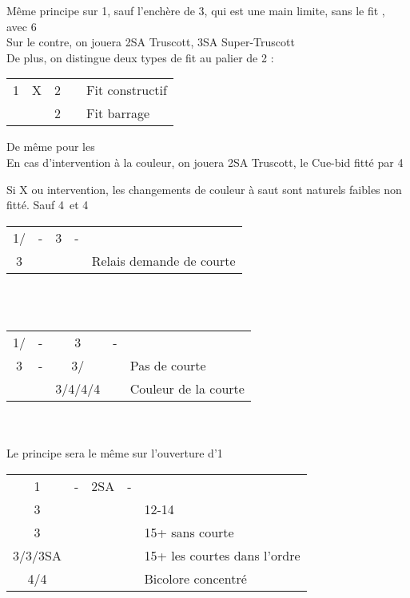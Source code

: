 \documentclass[a4paper, oneside, 11pt]{report}
\begin{document}
	Même principe sur 1\pique, sauf l'enchère de 3\coeur, qui est une main limite, sans le fit \pique, avec 6\coeur\\

		Sur le contre, on jouera 2SA Truscott, 3SA Super-Truscott\\
		De plus, on distingue deux types de fit au palier de 2 :

		\begin{tabular}{cccc|l}
		1\coeur & X & 2\carreau && Fit constructif\\
		&& 2\coeur && Fit barrage\\
		\end{tabular}
		
		De même pour les \pique\\

		En cas d'intervention à la couleur, on jouera 2SA Truscott, le Cue-bid fitté par 4
		
		Si X ou intervention, les changements de couleur à saut sont naturels faibles non fitté. Sauf 4\trefle\ et 4\carreau\\

		\begin{tabular}{cccc|l}
		1\coeur/\pique & - & 3\trefle & - &\\
		3\carreau &&&& Relais demande de courte\\
		\end{tabular}\\\\
		
		\begin{tabular}{cccc|l}
		1\coeur/\pique & - & 3\trefle & - &\\
		3\carreau & - & 3\coeur/\pique && Pas de courte\\
		&& 3\pique/4\trefle/4\carreau/4\coeur && Couleur de la courte\\
		\end{tabular}\\\\

		Le principe sera le même sur l'ouverture d'1\pique\\
		
		\begin{tabular}{cccc|l}
		1\coeur & - & 2SA & - &\\
		3\trefle &&&& 12-14\\
		3\carreau &&&& 15+ sans courte\\
		3\coeur/3\pique/3SA &&&& 15+ les courtes dans l'ordre\\
		4\trefle/4\carreau &&&& Bicolore concentré\\
		\end{tabular}\\\\
		
\end{document}
